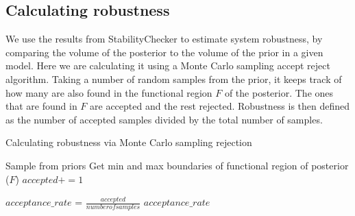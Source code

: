 \subsection{Calculating robustness}

We use the results from StabilityChecker to estimate system robustness, by comparing the volume of the posterior to the volume of the prior in a given model. Here we are calculating it using a Monte Carlo sampling accept reject algorithm. Taking a number of random samples from the prior, it keeps track of how many are also found in the functional region $F$ of the posterior. The ones that are found in $F$ are accepted and the rest rejected. Robustness is then defined as the number of accepted samples divided by the total number of samples.
\begin{algorithm}[ht]
	\label{alg:robustness}
  \caption{Calculating robustness via Monte Carlo sampling rejection }
 \begin{algorithmic}[1]
    \Statex
    \State Sample from priors 
    \State Get min and max boundaries of functional region of posterior ($F$)
    	\State $accepted += 1$
    \EndIf
    	    	
    \State $acceptance\_rate$ = $\frac{accep
    	ted}{number of samples}$
    \State \Return $acceptance\_rate$
    
  \end{algorithmic}

\end{algorithm}

\newpage






